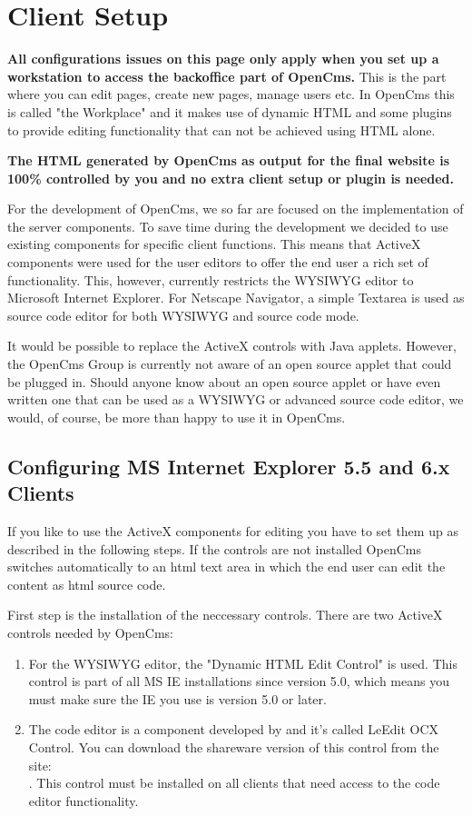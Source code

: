 \chapter{Client Setup}

\textbf{All configurations issues on this page only apply when you
set up a workstation to access the backoffice part of OpenCms.}
This is the part where you can edit pages, create new pages,
manage users etc. In OpenCms this is called "the Workplace" and it
makes use of dynamic HTML and some plugins to provide editing
functionality that can not be achieved using HTML alone.

\textbf{The HTML generated by OpenCms as output for the final
website is 100\% controlled by you and no extra client setup or
plugin is needed.}

For the development of OpenCms, we so far are focused on the
implementation of the server components. To save time during the
development we decided to use existing components for specific
client functions. This means that ActiveX components were used for
the user editors to offer the end user a rich set of
functionality. This, however, currently restricts the WYSIWYG
editor to Microsoft Internet Explorer. For Netscape Navigator, a
simple Textarea is used as source code editor for both WYSIWYG and
source code mode.

It would be possible to replace the ActiveX controls with Java
applets. However, the OpenCms Group is currently not aware of an
open source applet that could be plugged in. Should anyone know about
an open source applet or have even written one that can be used as
a WYSIWYG or advanced source code editor, we would, of course, be
more than happy to use it in OpenCms.


\section{Configuring MS Internet Explorer 5.5 and 6.x Clients}

If you like to use the ActiveX components for editing you have to set
them up as described in the following steps. If the controls are not 
installed OpenCms switches automatically to an html text area in which 
the end user can edit the content as html source code.

First step is the installation of the neccessary controls. There are
two ActiveX controls needed by OpenCms:

\begin{enumerate}
\item For the WYSIWYG editor, the "Dynamic HTML Edit Control" is
used. This control is part of all MS IE installations since
version 5.0, which means you must make sure the IE you use is
version 5.0 or later.
\item The code editor is a component developed by 
     and it's
called LeEdit OCX Control. You can download the shareware version
of this control from the site:\\
.
This control must be installed on all clients that need access to
the code editor functionality.
\end{enumerate}

